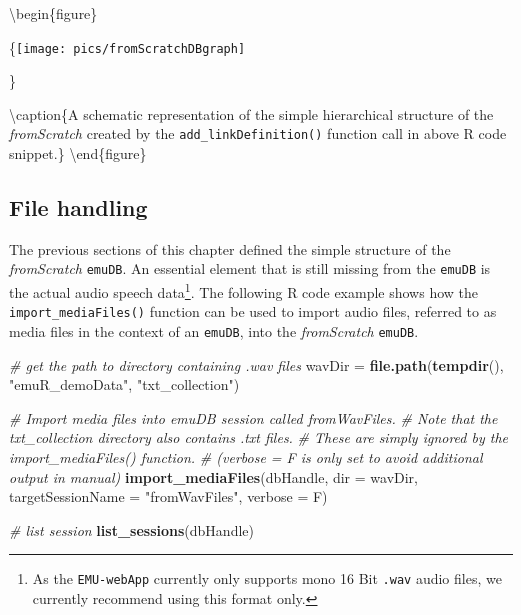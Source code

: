 \documentclass[]{book}
\newenvironment{Shaded}{\begin{snugshade}}{\end{snugshade}}
\newcommand{\CommentTok}[1]{\textcolor[rgb]{0.56,0.35,0.01}{\textit{#1}}}
\newcommand{\DataTypeTok}[1]{\textcolor[rgb]{0.13,0.29,0.53}{#1}}
\newcommand{\KeywordTok}[1]{\textcolor[rgb]{0.13,0.29,0.53}{\textbf{#1}}}
\newcommand{\NormalTok}[1]{#1}
\newcommand{\StringTok}[1]{\textcolor[rgb]{0.31,0.60,0.02}{#1}}
\begin{document}
\textbackslash{}begin\{figure\}

\{\centering \texttt{[image: pics/fromScratchDBgraph]}

\}

\textbackslash{}caption\{A schematic representation of the simple hierarchical structure of the \emph{fromScratch} created by the \texttt{add\_linkDefinition()} function call in above R code snippet.\}\label{fig:emuDB-fromScratchHier}
\textbackslash{}end\{figure\}

\hypertarget{file-handling}{%
\subsection{File handling}\label{file-handling}}

The previous sections of this chapter defined the simple structure of the \emph{fromScratch} \texttt{emuDB}. An essential element that is still missing from the \texttt{emuDB} is the actual audio speech data\footnote{As the \texttt{EMU-webApp} currently only supports mono 16 Bit \texttt{.wav} audio files, we currently recommend using this format only.}. The following R code example shows how the \texttt{import\_mediaFiles()} function can be used to import audio files, referred to as media files in the context of an \texttt{emuDB}, into the \emph{fromScratch} \texttt{emuDB}.

\begin{Shaded}
\begin{Highlighting}[]
\CommentTok{# get the path to directory containing .wav files}
\NormalTok{wavDir =}\StringTok{ }\KeywordTok{file.path}\NormalTok{(}\KeywordTok{tempdir}\NormalTok{(), }\StringTok{"emuR_demoData"}\NormalTok{, }\StringTok{"txt_collection"}\NormalTok{)}

\CommentTok{# Import media files into emuDB session called fromWavFiles.}
\CommentTok{# Note that the txt_collection directory also contains .txt files.}
\CommentTok{# These are simply ignored by the import_mediaFiles() function.}
\CommentTok{# (verbose = F is only set to avoid additional output in manual)}
\KeywordTok{import_mediaFiles}\NormalTok{(dbHandle,}
                  \DataTypeTok{dir =}\NormalTok{ wavDir,}
                  \DataTypeTok{targetSessionName =} \StringTok{"fromWavFiles"}\NormalTok{,}
                  \DataTypeTok{verbose =}\NormalTok{ F)}

\CommentTok{# list session}
\KeywordTok{list_sessions}\NormalTok{(dbHandle)}
\end{Highlighting}
\end{Shaded}
\end{document}
